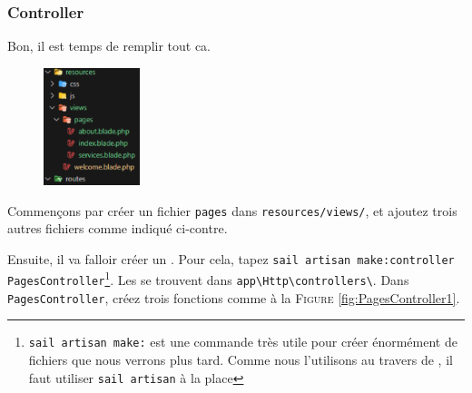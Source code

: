 \subsubsection[Controller][laravel.com/docs/10.x/controllers\#introduction]{Controller}

Bon, il est temps de remplir tout ca.

\begin{figure}
    \vspace{-0.5cm}
    \includegraphics[width=0.25\textwidth]{figures-C1/3_premieres_views.pdf}
\end{figure}

Commençons par créer un fichier \verb|pages| dans \verb|resources/views/|, et ajoutez trois autres fichiers comme indiqué ci-contre.

Ensuite, il va falloir créer un \controller{}. Pour cela, tapez
\verb|sail artisan make:controller PagesController|\footnote{\verb|sail artisan make:| est une commande très utile pour créer énormément de fichiers que nous verrons plus tard. Comme nous l'utilisons au travers de \laravelsail, il faut utiliser \verb|sail artisan| à la place}. \linebreak Les \controllers{} se trouvent dans \verb|app\Http\controllers\|. Dans \verb|PagesController|, créez trois fonctions comme à la \textsc{Figure }\ref{fig:PagesController1}.

